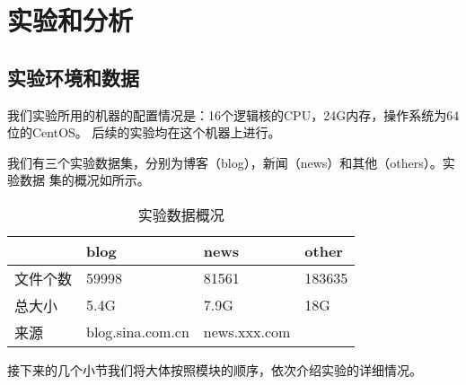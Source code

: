 \section{实验和分析}
\label{sec:result-analysis}

\subsection{实验环境和数据}
\label{sec:dataenv}
我们实验所用的机器的配置情况是：16个逻辑核的CPU，24G内存，操作系统为64位的CentOS。
后续的实验均在这个机器上进行。

我们有三个实验数据集，分别为博客（blog），新闻（news）和其他（others）。实验数据
集的概况如所示。%
\begin{table}[h]
  \centering
\begin{tabular}{llll}
\toprule
 & blog & news & other \\
\hline
文件个数 & 59998 & 81561 & 183635 \\
总大小 & 5.4G & 7.9G & 18G \\
来源 & blog.sina.com.cn &  news.xxx.com &  \\
\bottomrule
\end{tabular}
  \caption{实验数据概况}
  \label{experiment:tab:overview}
\end{table}
\begin{comment}
#+ORGTBL: SEND 实验数据概况 orgtbl-to-latex :splice nil :skip 0
|          | blog             | news  | other  |
|----------+------------------+-------+--------|
| 文件个数 | 59998            | 81561 | 183635 |
| 总大小   | 5.4G             | 7.9G  | 18G    |
| 来源     | blog.sina.com.cn |       |        |
\end{comment}

接下来的几个小节我们将大体按照模块的顺序，依次介绍实验的详细情况。
\label{sec:results}
